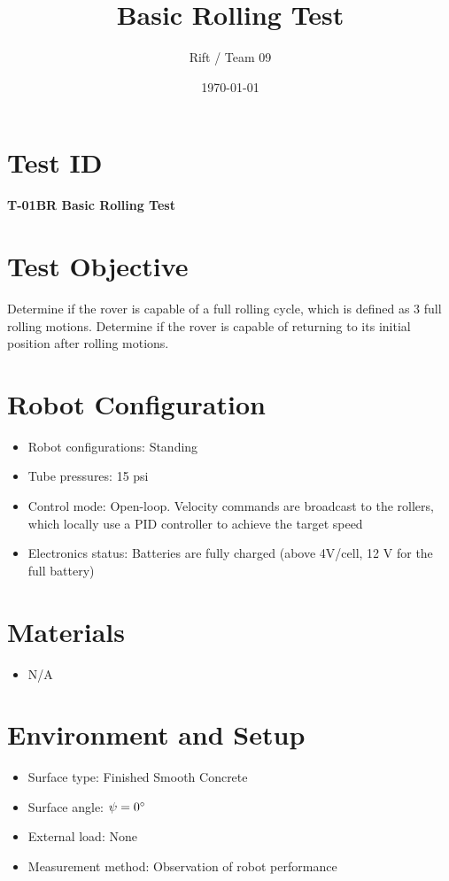 \documentclass[11pt]{article}
\title{Basic Rolling Test}
\author{Rift / Team 09}
\date{\today}
\begin{document}
\maketitle

\section*{Test ID}
\textbf{T-01BR Basic Rolling Test} 

\section*{Test Objective}
Determine if the rover is capable of a full rolling cycle, which is defined as 3 full rolling motions. Determine if the rover is capable of returning to its initial position after rolling motions.

\section*{Robot Configuration}
\begin{itemize}[noitemsep]
    \item Robot configurations: Standing
    \item Tube pressures: 15 psi
    \item Control mode: Open-loop. Velocity commands are broadcast to the rollers, which locally use a PID controller to achieve the target speed
    \item Electronics status: Batteries are fully charged (above 4V/cell, 12 V for the full battery)
\end{itemize}

\section*{Materials}
\begin{itemize}[noitemsep]
    \item N/A
    
\end{itemize}

\section*{Environment and Setup}
\begin{itemize}[noitemsep]
    \item Surface type: Finished Smooth Concrete
    \item Surface angle: $\psi = 0 {\degree}$ 
    \item External load: None 
    \item Measurement method: Observation of robot performance
\end{itemize}
\end{document}
